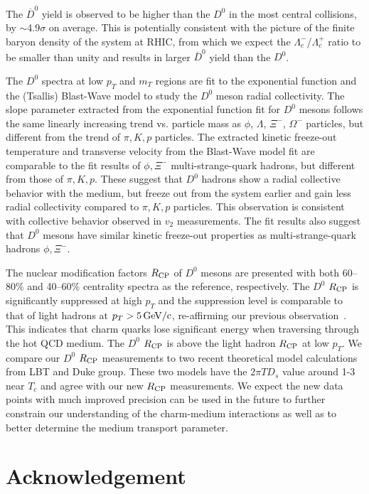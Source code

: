 \documentclass[%
 reprint,	
 amsmath,amssymb,
 aps,
 prc,
]{revtex4-1}
\begin{document}
The $\overline{D}^{0}$ yield is observed to be higher than the $D^0$ in the most central collisions, by $\sim$4.9$\sigma$ on average. This is potentially consistent with the picture of the finite baryon density of the system at RHIC, from which we expect the $\Lambda_{c}^-$/$\Lambda_{c}^+$ ratio to be smaller than unity and results in larger $\overline{D}^{0}$ yield than the $D^0$.

The $D^0$ spectra at low $p_{T}$ and $m_{T}$ regions are fit to the exponential function and the (Tsallis) Blast-Wave model to study the $D^0$ meson radial collectivity. The slope parameter extracted from the exponential function fit for $D^0$ mesons follows the same linearly increasing trend vs. particle mass as $\phi$, $\Lambda$, $\Xi^-$, $\Omega^-$ particles, but different from the trend of $\pi,K,p$ particles. The extracted kinetic freeze-out temperature and transverse velocity from the Blast-Wave model fit are comparable to the fit results of $\phi,\Xi^-$ multi-strange-quark hadrons, but different from those of $\pi,K,p$. These suggest that $D^0$ hadrons show a radial collective behavior with the medium, but freeze out from the system earlier and gain less radial collectivity compared to $\pi,K,p$ particles. This observation is consistent with collective behavior observed in $v_2$ measurements. The fit results also suggest that $D^0$ mesons have similar kinetic freeze-out properties as multi-strange-quark hadrons $\phi,\Xi^-$.

The nuclear modification factors $R_{\rm CP}$ of $D^0$ mesons are presented with both 60--80\% and 40--60\% centrality spectra as the reference, respectively. The $D^0$ $R_{\rm CP}$ is significantly suppressed at high $p_{T}$ and the suppression level is comparable to that of light hadrons at $p_{T}> 5\,\rm{GeV}/c$, re-affirming our previous observation~\cite{Star_D_RAA}. This indicates that charm quarks lose significant energy when traversing through the hot QCD medium. The $D^0$ $R_{\rm CP}$ is above the light hadron $R_{\rm CP}$ at low $p_{T}$. We compare our $D^0$ $R_{\rm CP}$ measurements to two recent theoretical model calculations from LBT and Duke group. These two models have the $2\pi TD_s$ value around 1-3 near $T_{c}$ and agree with our new $R_{\rm CP}$ measurements. We expect the new data points with much improved precision can be used in the future to further constrain our understanding of the charm-medium interactions as well as to better determine the medium transport parameter.

\section{Acknowledgement}
\label{acknowledgement}
\end{document}

